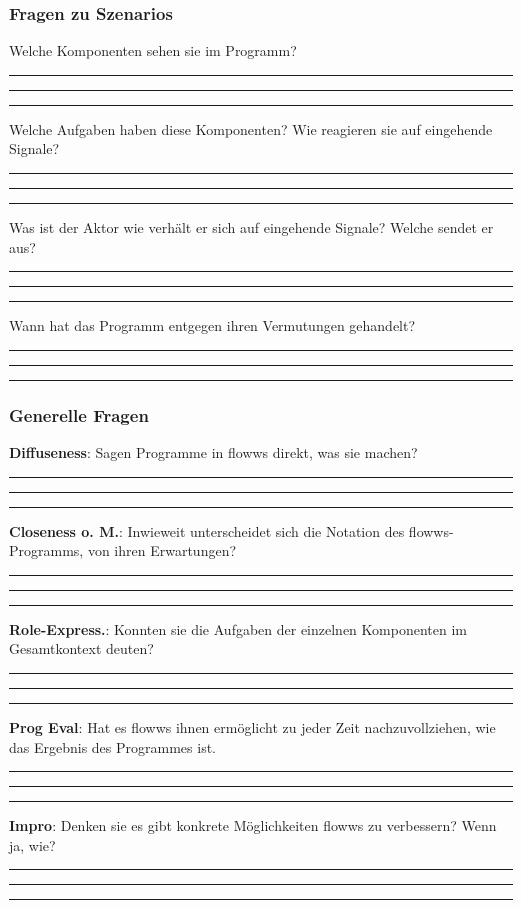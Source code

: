 \newpage

\subsubsection{Fragen zu Szenarios}
Welche Komponenten sehen sie im Programm?\\
\noindent\rule{\textwidth}{1pt}
\noindent\rule{\textwidth}{1pt}
\noindent\rule{\textwidth}{1pt}

Welche Aufgaben haben diese Komponenten? Wie reagieren sie auf eingehende Signale?\\
\noindent\rule{\textwidth}{1pt}
\noindent\rule{\textwidth}{1pt}
\noindent\rule{\textwidth}{1pt}

Was ist der Aktor wie verhält er sich auf eingehende Signale? Welche sendet er aus?\\
\noindent\rule{\textwidth}{1pt}
\noindent\rule{\textwidth}{1pt}
\noindent\rule{\textwidth}{1pt}

Wann hat das Programm entgegen ihren Vermutungen gehandelt?\\
\noindent\rule{\textwidth}{1pt}
\noindent\rule{\textwidth}{1pt}
\noindent\rule{\textwidth}{1pt}

\newpage
\subsubsection{Generelle Fragen}
\textbf{Diffuseness}: Sagen Programme in flowws direkt, was sie machen?\\
\noindent\rule{\textwidth}{1pt}
\noindent\rule{\textwidth}{1pt}
\noindent\rule{\textwidth}{1pt}

\textbf{Closeness o. M.}: Inwieweit unterscheidet sich die Notation des flowws-\\Programms, von ihren Erwartungen?\\
\noindent\rule{\textwidth}{1pt}
\noindent\rule{\textwidth}{1pt}
\noindent\rule{\textwidth}{1pt}

\textbf{Role-Express.}: Konnten sie die Aufgaben der einzelnen Komponenten im Gesamtkontext deuten?\\
\noindent\rule{\textwidth}{1pt}
\noindent\rule{\textwidth}{1pt}
\noindent\rule{\textwidth}{1pt}

\textbf{Prog Eval}: Hat es flowws ihnen ermöglicht zu jeder Zeit nachzuvollziehen, wie das Ergebnis des Programmes ist.\\
\noindent\rule{\textwidth}{1pt}
\noindent\rule{\textwidth}{1pt}
\noindent\rule{\textwidth}{1pt}

\textbf{Impro}: Denken sie es gibt konkrete Möglichkeiten flowws zu verbessern? Wenn ja, wie?\\
\noindent\rule{\textwidth}{1pt}
\noindent\rule{\textwidth}{1pt}
\noindent\rule{\textwidth}{1pt}
\newpage


